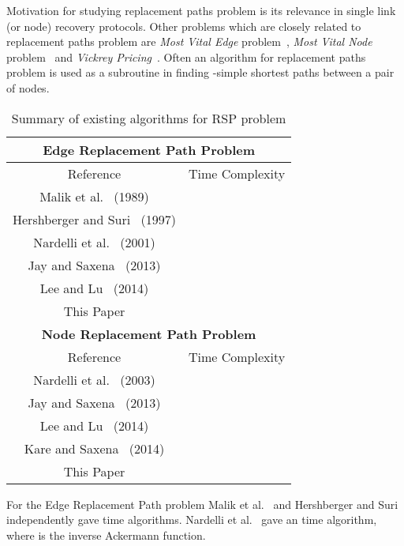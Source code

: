 \documentclass[11pt,a4paper]{llncs}
\begin{document}
Motivation for studying replacement paths problem is its relevance in single link (or node) recovery protocols.
Other problems which are closely related to replacement paths problem are \emph{Most Vital Edge} problem~\cite{fastermve},
\emph{Most Vital Node} problem~\cite{mostvn} and \emph{Vickrey Pricing}~\cite{vickreyprice}.
Often an algorithm for replacement paths problem is used as a subroutine in finding -simple
shortest paths between a pair of nodes.

\begin{table}[H]
\centering
\begin{tabular}{|c|c|}
\hline
  \multicolumn{2}{|c|}{\textbf{Edge Replacement Path Problem}}  \\
  \hline
  Reference & Time Complexity  \\
  \hline
  Malik et al.~\cite{kmve} (1989) &   \\
  \hline
  Hershberger and Suri~\cite{vickreyprice} (1997) &   \\
  \hline
  Nardelli et al.~\cite{fastermve} (2001) &   \\
  \hline
  Jay and Saxena~\cite{jay} (2013) &   \\
  \hline
  Lee and Lu~\cite{linearrsp} (2014) &   \\
  \hline
  This Paper &   \\
  \hline
  \multicolumn{2}{|c|}{\textbf{Node Replacement Path Problem}}  \\
  \hline
  Reference & Time Complexity  \\
  \hline
  Nardelli et al.~\cite{mostvn} (2003) &   \\
  \hline
  Jay and Saxena~\cite{jay} (2013) &   \\
  \hline
  Lee and Lu~\cite{linearrsp} (2014) &   \\
  \hline
  Kare and Saxena~\cite{asksax} (2014) &   \\
  \hline
  This Paper &   \\
  \hline
  \end{tabular}
\label{table1}
\caption{Summary of existing algorithms \protect\footnotemark for RSP problem}
\end{table}


For the Edge Replacement Path problem Malik et al.~\cite{kmve} and Hershberger
and Suri~\cite{vickreyprice} independently gave 
time algorithms. Nardelli et al.~\cite{fastermve} gave an 
time algorithm, where  is the inverse Ackermann function.
\end{document}

